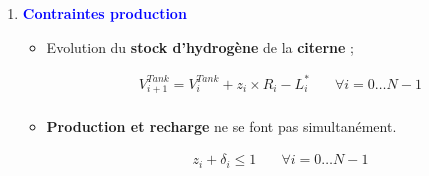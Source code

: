 \documentclass[hyperref={bookmarks=false},aspectratio=169]{beamer}
\begin{document}
\begin{frame}
\begin{enumerate}
\begin{itemize}
\end{itemize}
\pause
\item \textbf{\textcolor{blue}{Contraintes production}} 
\begin{itemize}

			
	
\item Evolution du \textbf{stock d'hydrogène} de la \textbf{citerne} ;

\small{
	\begin{equation}
		\begin{array}{lll}
	
			 &V_{i+1}^{Tank} = V_{i}^{Tank} + z_i \times R_i -L_i^*& \quad \forall i = 0 \dots N-1\\
	
		\end{array}
	\end{equation}
}

\item \textbf{Production et recharge} ne se font pas simultanément.

\small{

	\begin{equation}
		\begin{array}{lll}
			 &z_i+\delta_i \leq 1 &\quad \forall i = 0 \dots N-1 \\
			

\end{array}
\end{equation}}
\end{itemize}
\end{enumerate}
\end{frame}
\end{document}
